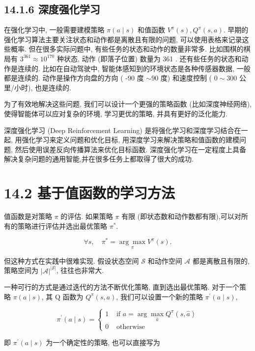 \documentclass[10pt]{article}
\begin{document}
\subsection*{14.1.6 深度强化学习}
在强化学习中, 一般需要建模策略 $\pi(a \mid s)$ 和值函数 $V^{\pi}(s), Q^{\pi}(s, a)$. 早期的强化学习算法主要关注状态和动作都是离散且有限的问题, 可以使用表格来记录这些概率. 但在很多实际问题中, 有些任务的状态和动作的数量非常多. 比如围棋的棋局有 $3^{361} \approx 10^{170}$ 种状态, 动作 (即落子位置) 数量为 361 . 还有些任务的状态和动作是连续的. 比如在自动驾驶中, 智能体感知到的环境状态是各种传感器数据, 一般都是连续的. 动作是操作方向盘的方向 ( -90 度 $\sim 90$ 度) 和速度控制 ( $0 \sim 300$ 公里/小时), 也是连续的.

为了有效地解决这些问题, 我们可以设计一个更强的策略函数 (比如深度神经网络), 使得智能体可以应对复杂的环境, 学习更优的策略, 并具有更好的泛化能力.

深度强化学习 (Deep Reinforcement Learning) 是将强化学习和深度学习结合在一起, 用强化学习来定义问题和优化目标, 用深度学习来解决策略和值函数的建模问题, 然后使用误差反向传播算法来优化目标函数. 深度强化学习在一定程度上具备解决复杂问题的通用智能,并在很多任务上都取得了很大的成功.

\section*{14.2 基于值函数的学习方法}
值函数是对策略 $\pi$ 的评估. 如果策略 $\pi$ 有限 (即状态数和动作数都有限),可以对所有的策略进行评估并选出最优策略 $\pi^{*}$.


\begin{equation*}
\forall s, \quad \pi^{*}=\underset{\pi}{\arg \max } V^{\pi}(s) . \tag{14.22}
\end{equation*}


但这种方式在实践中很难实现. 假设状态空间 $\mathcal{S}$ 和动作空间 $\mathcal{A}$ 都是离散且有限的,策略空间为 $|\mathcal{A}|^{|\mathcal{S}|}$, 往往也非常大.

一种可行的方式是通过迭代的方法不断优化策略, 直到选出最优策略. 对于一个策略 $\pi(a \mid s)$, 其 $\mathrm{Q}$ 函数为 $Q^{\pi}(s, a)$, 我们可以设置一个新的策略 $\pi^{\prime}(a \mid s)$,

\[
\pi^{\prime}(a \mid s)= \begin{cases}1 & \text { if } a=\arg \max _{\hat{a}} Q^{\pi}(s, \hat{a})  \tag{14.23}\\ 0 & \text { otherwise }\end{cases}
\]

即 $\pi^{\prime}(a \mid s)$ 为一个确定性的策略, 也可以直接写为
\end{document}
